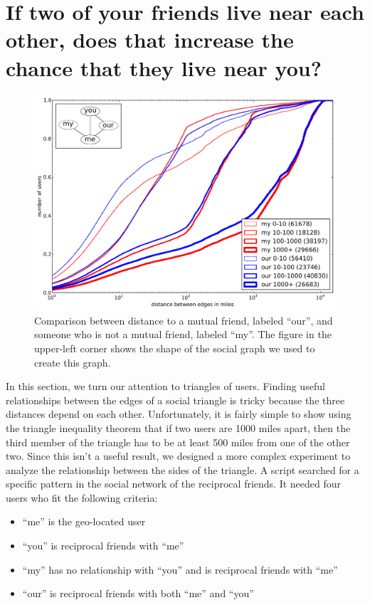 \section{If two of your friends live near each other, does that increase the
chance that they live near you?}

\begin{figure}[tb]
\centering
\includegraphics[width=\linewidth]{figures/near_triads.pdf}
\caption{
Comparison between distance to a mutual friend, labeled ``our'', and someone
who is not a mutual friend, labeled ``my''.
The figure in the upper-left corner shows the shape of the social graph we used
to create this graph.
}
\label{fig:NearTriads}
\end{figure}

In this section, we turn our attention to triangles of users.
Finding useful relationships between the edges of a social triangle is tricky
because the three distances depend on each other.
Unfortunately, it is fairly simple to show using the triangle inequality theorem
that if two users are 1000 miles apart, then the third member of the triangle
has to be at least 500 miles from one of the other two.
Since this isn't a useful result, we designed a more complex experiment to
analyze the relationship between the sides of the triangle.
A script searched for a specific pattern in the social network of the
reciprocal friends.  It needed four users who fit the following criteria:
\begin{itemize}
\item ``me'' is the geo-located user
\item ``you'' is reciprocal friends with ``me''
\item ``my'' has no relationship with ``you'' and is reciprocal friends with ``me''
\item ``our'' is reciprocal friends with both ``me'' and ``you''
\end{itemize}

